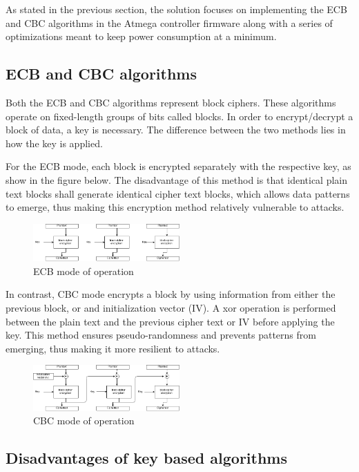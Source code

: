 As stated in the previous section, the solution focuses on implementing 
the ECB and CBC algorithms in the Atmega controller firmware along with a series 
of optimizations meant to keep power consumption at a minimum.

\subsection{ECB and CBC algorithms}

Both the ECB and CBC algorithms represent block ciphers. These algorithms operate 
on fixed-length groups of bits called blocks. In order to encrypt/decrypt a block 
of data, a key is necessary. The difference between the two methods lies in how 
the key is applied.

For the ECB mode, each block is encrypted separately with the respective key, as 
show in the figure below. The disadvantage of this method is that identical plain text 
blocks shall generate identical cipher text blocks, which allows data patterns to 
emerge, thus making this encryption method relatively vulnerable to attacks.

\begin{figure}[ht] \centering
  \includegraphics[width=0.5\textwidth]{img/ECB-function-mode.png}
  \caption{ECB mode of operation}
\end{figure}

In contrast, CBC mode encrypts a block by using information from either the previous 
block, or and initialization vector (IV). A xor operation is performed between the 
plain text and the previous cipher text or IV before applying the key. This method 
ensures pseudo-randomness and prevents patterns from emerging, thus making it 
more resilient to attacks.

\begin{figure}[ht] \centering
  \includegraphics[width=0.5\textwidth]{img/CBC-function-mode.png}
  \caption{CBC mode of operation}
\end{figure}

\subsection{Disadvantages of key based algorithms}

